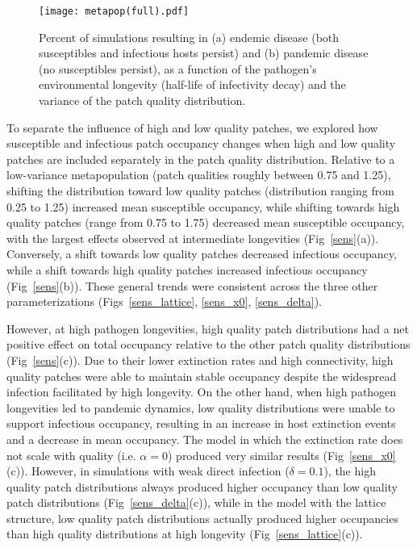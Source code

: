 \documentclass{svjour3}
\begin{document}
\begin{figure}
\centering
\texttt{[image: metapop(full).pdf]}
\caption{Percent of simulations resulting in (a) endemic disease (both susceptibles and infectious hosts persist) and (b) pandemic disease (no susceptibles persist), as a function of the pathogen's environmental longevity (half-life of infectivity decay) and the variance of the patch quality distribution.}
\label{poutcome}
\end{figure}   

To separate the influence of high and low quality patches, we explored how susceptible and infectious patch occupancy changes when high and low quality patches are included separately in the patch quality distribution.  Relative to a low-variance metapopulation (patch qualities roughly between 0.75 and 1.25), shifting the distribution toward low quality patches (distribution ranging from 0.25 to 1.25) increased mean susceptible occupancy, while shifting towards high quality patches (range from 0.75 to 1.75) decreased mean susceptible occupancy, with the largest effects observed at intermediate longevities (Fig~\ref{sens}(a)).  Conversely, a shift towards low quality patches decreased infectious occupancy, while a shift towards high quality patches increased infectious occupancy (Fig~\ref{sens}(b)).  These general trends were consistent across the three other parameterizations (Figs~\ref{sens_lattice}, \ref{sens_x0}, \ref{sens_delta}).  

However, at high pathogen longevities, high quality patch distributions had a net positive effect on total occupancy relative to the other patch quality distributions (Fig~\ref{sens}(c)).  Due to their lower extinction rates and high connectivity, high quality patches were able to maintain stable occupancy despite the widespread infection facilitated by high longevity.  On the other hand, when high pathogen longevities led to pandemic dynamics, low quality distributions were unable to support infectious occupancy, resulting in an increase in host extinction events and a decrease in mean occupancy.  The model in which the extinction rate does not scale with quality (i.e. $\alpha = 0$) produced very similar results (Fig~\ref{sens_x0}(c)).  However, in simulations with weak direct infection ($\delta = 0.1$), the high quality patch distributions always produced higher occupancy than low quality patch distributions (Fig~\ref{sens_delta}(c)), while in the model with the lattice structure, low quality patch distributions actually produced higher occupancies than high quality distributions at high longevity (Fig~\ref{sens_lattice}(c)).
\end{document}
